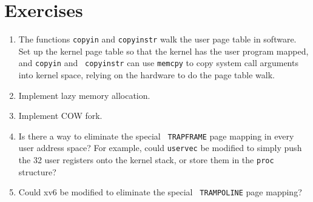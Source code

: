 \section{Exercises}

\begin{enumerate}

\item The functions {\tt copyin} and {\tt copyinstr} walk the user
  page table in software.  Set up the kernel page table so that the
  kernel has the user program mapped, and {\tt copyin} and {\tt
    copyinstr} can use {\tt memcpy} to copy system call arguments into
  kernel space, relying on the hardware to do the page table walk.

\item Implement lazy memory allocation.

\item Implement COW fork.

\item Is there a way to eliminate the special {\tt
  TRAPFRAME} page mapping in every user address space? For
  example, could
  {\tt uservec} be modified to simply push the 32 user registers
  onto the kernel stack, or store them in the {\tt proc}
  structure?

\item Could xv6 be modified to eliminate the special {\tt
  TRAMPOLINE} page mapping?

\end{enumerate}

